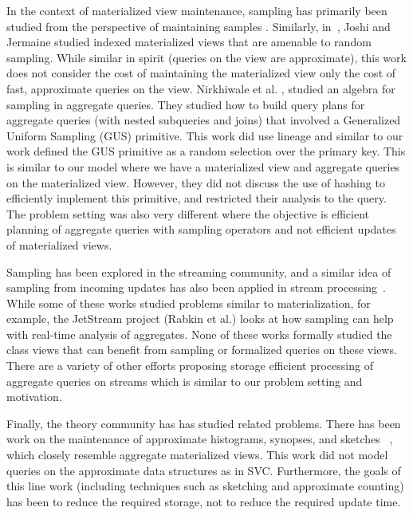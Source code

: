 In the context of materialized view maintenance, sampling has primarily been studied from the perspective of maintaining samples \cite{DBLP:conf/icde/OlkenR92}.
Similarly, in~\cite{joshi2008materialized}, Joshi and Jermaine studied indexed materialized views that are amenable to random sampling.
While similar in spirit (queries on the view are approximate), this work does not consider the cost of maintaining the materialized view only the cost of fast, approximate queries on the view.
Nirkhiwale et al. \cite{DBLP:journals/pvldb/NirkhiwaleDJ13}, studied an algebra for sampling in aggregate queries.
They studied how to build query plans for aggregate queries (with nested subqueries and joins) that involved a Generalized Uniform Sampling (GUS) primitive.
This work did use lineage and similar to our work defined the GUS primitive as a random selection over the primary key.
This is similar to our model where we have a materialized view and aggregate queries on the materialized view.
However, they did not discuss the use of hashing to efficiently implement this primitive, and restricted their analysis to the \sumfunc query.
The problem setting was also very different where the objective is efficient planning of aggregate queries with sampling operators and not efficient updates of materialized views.

Sampling has been explored in the streaming community, and a similar idea of sampling from incoming updates has also been applied in stream processing~\cite{tatbul2003load, Garofalakis, rabkin2014aggregation}.
While some of these works studied problems similar to materialization, for example, the JetStream project (Rabkin et al.) looks at how sampling can help with real-time analysis of aggregates.
None of these works formally studied the class views that can benefit from sampling or formalized queries on these views.
There are a variety of other efforts proposing storage efficient processing of aggregate queries on streams \cite{dobra2002processing, greenwald2001space} which is similar to our problem setting and motivation.

Finally, the theory community has has studied related problems.
There has been work on the maintenance of approximate histograms, synopses, and sketches ~\cite{gibbons1997fast, DBLP:journals/ftdb/CormodeGHJ12}, which closely resemble aggregate materialized views.
This work did not model queries on the approximate data structures as in SVC.
Furthermore, the goals of this line work (including techniques such as sketching and approximate counting) has been to reduce the required storage, not to reduce the required update time.

